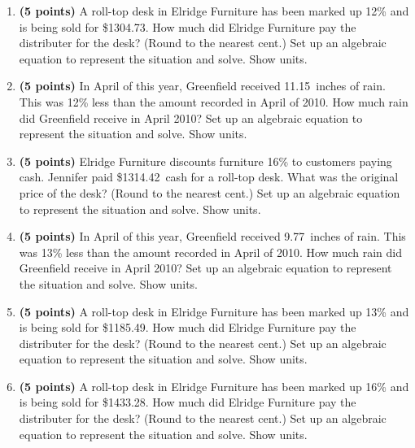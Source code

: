 \documentclass[12pt]{amsart}
\begin{document}
\begin{enumerate}
\vfill 
\def \discount{12}\def \paid{1304.73}\def \rainy{10.08}\def \orcost{1482.65}\def \purcost{1164.94}\def \orrainy{11.45}
\item {\bf (5 points)} 
 A roll-top desk in Elridge Furniture has been marked up \discount\% and is being sold for \$\paid. How much did Elridge Furniture pay the distributer for the desk? (Round to the nearest cent.) Set up an algebraic equation to represent the situation and solve. Show units.

\vfill 
\def \discount{12}\def \paid{1903.07}\def \rainy{11.15}\def \orcost{2162.58}\def \purcost{1699.17}\def \orrainy{12.67}
\item {\bf (5 points)} 
 In April of this year, Greenfield received \rainy\ inches of rain. This was \discount\% less than the amount recorded in April of 2010. How much rain did Greenfield  receive in April 2010? Set up an algebraic equation to represent the situation and solve. Show units.

\vfill 
\def \discount{16}\def \paid{1314.42}\def \rainy{8.87}\def \orcost{1564.79}\def \purcost{1133.12}\def \orrainy{10.56}
\item {\bf (5 points)} 
 Elridge Furniture discounts furniture \discount\% to customers paying cash. Jennifer paid \$\paid\ cash for a roll-top desk. What was the original price of the desk? (Round to the nearest cent.) Set up an algebraic equation to represent the situation and solve. Show units.

\vfill 
\def \discount{13}\def \paid{1956.83}\def \rainy{9.77}\def \orcost{2249.23}\def \purcost{1731.71}\def \orrainy{11.23}
\item {\bf (5 points)} 
 In April of this year, Greenfield received \rainy\ inches of rain. This was \discount\% less than the amount recorded in April of 2010. How much rain did Greenfield  receive in April 2010? Set up an algebraic equation to represent the situation and solve. Show units.

\vfill 
\def \discount{13}\def \paid{1185.49}\def \rainy{12.74}\def \orcost{1362.63}\def \purcost{1049.11}\def \orrainy{14.64}
\item {\bf (5 points)} 
 A roll-top desk in Elridge Furniture has been marked up \discount\% and is being sold for \$\paid. How much did Elridge Furniture pay the distributer for the desk? (Round to the nearest cent.) Set up an algebraic equation to represent the situation and solve. Show units.

\vfill 
\def \discount{16}\def \paid{1433.28}\def \rainy{12.96}\def \orcost{1706.29}\def \purcost{1235.59}\def \orrainy{15.43}
\item {\bf (5 points)} 
 A roll-top desk in Elridge Furniture has been marked up \discount\% and is being sold for \$\paid. How much did Elridge Furniture pay the distributer for the desk? (Round to the nearest cent.) Set up an algebraic equation to represent the situation and solve. Show units.


\end{enumerate}
\end{document}
